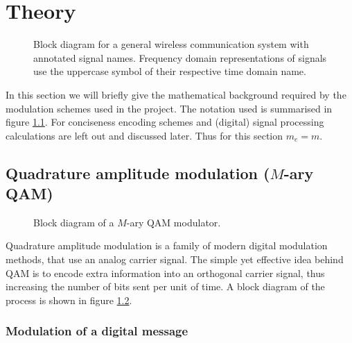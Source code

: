
\chapter{Theory}

\begin{figure}
	\centering
	\resizebox{\linewidth}{!}{
		
	}
	\caption{
		Block diagram for a general wireless communication system with annotated signal names. Frequency domain representations of signals use the uppercase symbol of their respective time domain name.
		\label{fig:notation}
	}
\end{figure}

In this section we will briefly give the mathematical background required by the modulation schemes used in the project. The notation used is summarised in figure \ref{fig:notation}. For conciseness encoding schemes and (digital) signal processing calculations are left out and discussed later. Thus for this section \(m_e = m\).



\section{Quadrature amplitude modulation (\(M\)-ary QAM)}

\begin{figure}
	\centering
	\resizebox{\linewidth}{!}{
		
	}
	\caption{
		Block diagram of a \(M\)-ary QAM modulator.
		\label{fig:quadrature-modulation}
	}
\end{figure}

Quadrature amplitude modulation is a family of modern digital modulation methods, that use an analog carrier signal. The simple yet effective idea behind QAM is to encode extra information into an orthogonal carrier signal, thus increasing the number of bits sent per unit of time. A block diagram of the process is shown in figure \ref{fig:quadrature-modulation}.


\subsection{Modulation of a digital message}


